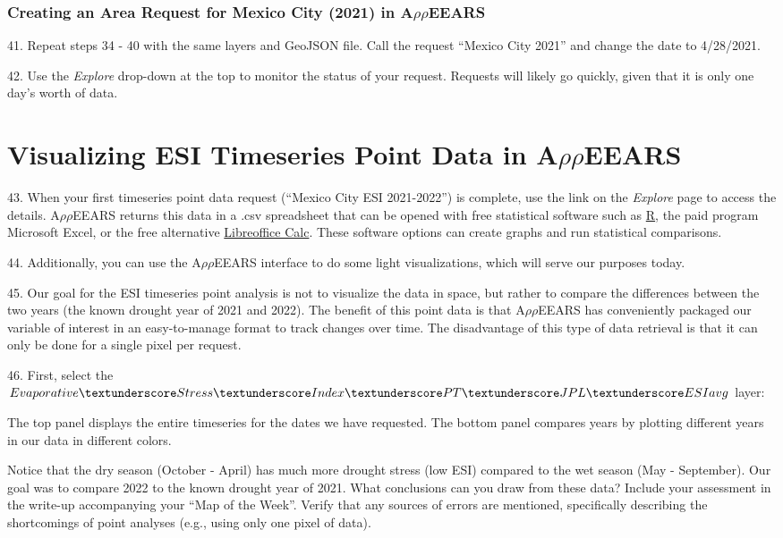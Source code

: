 \documentclass[oneside,a4paper,11pt,explicit]{book}
\begin{document}
\subsubsection{Creating an Area Request for Mexico City (2021) in A$\rho\rho$EEARS}

41. Repeat steps 34 - 40 with the same layers and GeoJSON file. Call the request ``Mexico City 2021'' and change the date to 4/28/2021.

42. Use the \textit{Explore} drop-down at the top to monitor the status of your request. Requests will likely go quickly, given that it is only one day's worth of data.

\section{Visualizing ESI Timeseries Point Data in A$\rho\rho$EEARS}

43. When your first timeseries point data request (``Mexico City ESI 2021-2022'') is complete, use the link on the \textit{Explore} page to access the details. A$\rho\rho$EEARS returns this data in a .csv spreadsheet that can be opened with free statistical software such as \href{https://www.r-project.org/about.html}{R}, the paid program Microsoft Excel, or the free alternative \href{https://www.libreoffice.org/}{Libreoffice Calc}. These software options can create graphs and run statistical comparisons. 

44. Additionally, you can use the A$\rho\rho$EEARS interface to do some light visualizations, which will serve our purposes today.

45. Our goal for the ESI timeseries point analysis is not to visualize the data in space, but rather to compare the differences between the two years (the known drought year of 2021 and 2022). The benefit of this point data is that A$\rho\rho$EEARS has conveniently packaged our variable of interest in an easy-to-manage format to track changes over time. The disadvantage of this type of data retrieval is that it can only be done for a single pixel per request. 

46. First, select the $Evaporative\textunderscore Stress\textunderscore Index\textunderscore PT\textunderscore JPL\textunderscore ESIavg$ layer:


The top panel displays the entire timeseries for the dates we have requested. The bottom panel compares years by plotting different years in our data in different colors. 

Notice that the dry season (October - April) has much more drought stress (low ESI) compared to the wet season (May - September). Our goal was to compare 2022 to the known drought year of 2021. What conclusions can you draw from these data? Include your assessment in the write-up accompanying your ``Map of the Week''. Verify that any sources of errors are mentioned, specifically describing the shortcomings of point analyses (e.g., using only one pixel of data).
\end{document}
